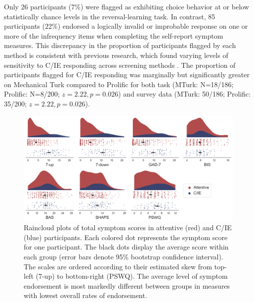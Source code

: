 \documentclass[a4paper,notitlepage,12pt]{article}
\begin{document}
Only 26 participants (7\%) were flagged as exhibiting choice behavior at or below statistically chance levels in the reversal-learning task. In contrast, 85 participants (22\%) endorsed a logically invalid or improbable response on one or more of the infrequency items when completing the self-report symptom measures. This discrepancy in the proportion of participants flagged by each method is consistent with previous research, which found varying levels of sensitivity to C/IE responding across screening methods \cite{desimone2018dirty}. The proportion of participants flagged for C/IE responding was marginally but significantly greater on Mechanical Turk compared to Prolific for both task (MTurk: N=18/186; Prolific: N=8/200; $z=2.22, p=0.026$) and survey data (MTurk: 50/186; Prolific: 35/200; $z = 2.22, p = 0.026$).

\begin{figure}[t!]
\includegraphics[width=16cm]{../figures/main_02a.png}
\centering
\captionsetup{width=0.88\textwidth}
\caption{Raincloud plots of total symptom scores in attentive (red) and C/IE (blue) participants. Each colored dot represents the symptom score for one participant. The black dots display the average score within each group (error bars denote 95\% bootstrap confidence interval). The scales are ordered according to their estimated skew from top-left (7-up) to bottom-right (PSWQ). The average level of symptom endorsement is most markedly different between groups in measures with lowest overall rates of endorsement.}
\label{fig:distributions}
\end{figure}
\end{document}
